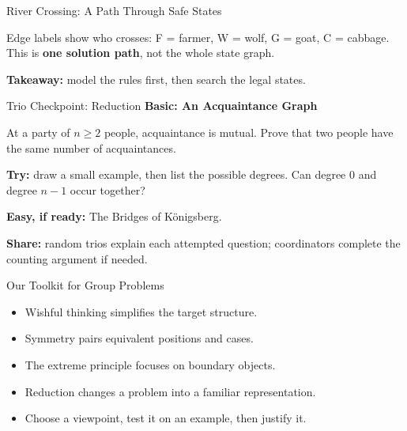 \documentclass{beamer}
\begin{document}
\begin{frame}{River Crossing: A Path Through Safe States}
    \begin{center}
    \end{center}
    \small Edge labels show who crosses: F = farmer, W = wolf,
    G = goat, C = cabbage. This is \textbf{one solution path}, not
    the whole state graph.

    \textbf{Takeaway:} model the rules first, then search the legal states.
\end{frame}

\begin{frame}{Trio Checkpoint: Reduction}
    \textbf{Basic: An Acquaintance Graph}

    At a party of $n\ge2$ people, acquaintance is mutual. Prove
    that two people have the same number of acquaintances.

    \textbf{Try:} draw a small example, then list the possible degrees.
    Can degree 0 and degree $n-1$ occur together?

    \textbf{Easy, if ready:} The Bridges of K\"onigsberg.

    \textbf{Share:} random trios explain each attempted question;
    coordinators complete the counting argument if needed.
\end{frame}

\begin{frame}{Our Toolkit for Group Problems}
    \begin{itemize}[<1->]
        \item Wishful thinking simplifies the target structure.
        \item Symmetry pairs equivalent positions and cases.
        \item The extreme principle focuses on boundary objects.
        \item Reduction changes a problem into a familiar representation.
        \item Choose a viewpoint, test it on an example, then justify it.
    \end{itemize}
\end{frame}
\end{document}
